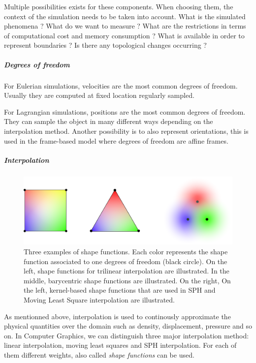 Multiple possibilities exists for these components. When choosing them, the context of the simulation needs to be taken into account.
What is the simulated phenomena ?
What do we want to measure ?
What are the restrictions in terms of computational cost and memory consumption ?
What is available in order to represent boundaries ?
Is there any topological changes occurring ?

\subparagraph{Degrees of freedom}
For Eulerian simulations, velocities are the most common degrees of freedom. Usually they are computed at fixed location regularly sampled.

For Lagrangian simulations, positions are the most common degrees of freedom. They can sample the object in many different ways depending on the interpolation method. Another possibility is to also represent orientations, this is used in the frame-based model where degrees of freedom are affine frames.

\subparagraph{Interpolation}

\begin{figure}[!ht]
\centering
\includegraphics[scale=0.4]{images/continuum_mechanics/shapefunction.png}
\caption[STAR mechanics: Shape functions]{\label{fig:shapefunction} Three examples of shape functions. Each color represents the shape function associated to one degrees of freedom (black circle). On the left, shape functions for trilinear interpolation are illustrated. In the middle, barycentric shape functions are illustrated. On the right, On the left, kernel-based shape functions that are used in SPH and Moving Least Square interpolation are illustrated.}
\end{figure}

As mentionned above, interpolation is used to continously approximate the physical quantities over the domain such as density, displacement, pressure and so on. In Computer Graphics, we can distinguish three major interpolation method: linear interpolation, moving least squares and SPH interpolation. For each of them different weights, also called \emph{shape functions} can be used. 

